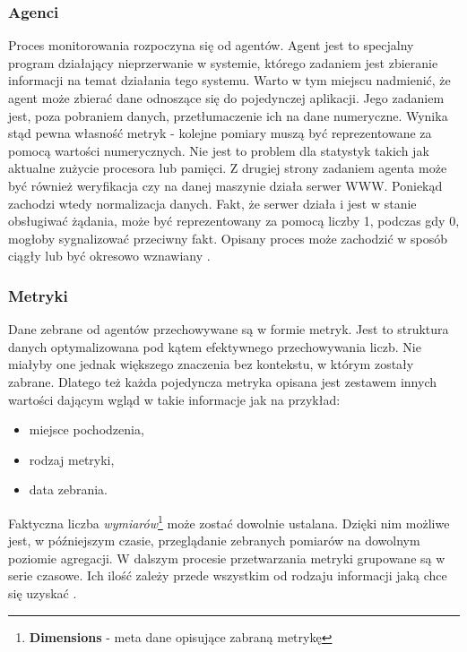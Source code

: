         \subsubsection{Agenci}
        Proces monitorowania rozpoczyna się od agentów. Agent jest to specjalny program działający nieprzerwanie w systemie, którego
        zadaniem jest zbieranie informacji na temat działania tego systemu. Warto w tym miejscu nadmienić, że agent może zbierać dane odnoszące się do pojedynczej aplikacji. Jego zadaniem jest, poza pobraniem danych, przetłumaczenie ich na dane 
        numeryczne. Wynika stąd pewna własność metryk - kolejne pomiary muszą być reprezentowane za pomocą wartości numerycznych.
        Nie jest to problem dla statystyk takich jak aktualne zużycie procesora lub pamięci. Z drugiej strony zadaniem agenta
        może być również weryfikacja czy na danej maszynie działa serwer WWW. Poniekąd zachodzi wtedy normalizacja danych. Fakt, że
        serwer działa i jest w stanie obsługiwać żądania, może być reprezentowany za pomocą liczby 1, podczas gdy 0, mogłoby sygnalizować
        przeciwny fakt. Opisany proces może zachodzić w sposób ciągły lub być okresowo wznawiany \cite{monitoring_and_alerting}.
        
        \subsubsection{Metryki}
        Dane zebrane od agentów przechowywane są w formie metryk. Jest to struktura danych optymalizowana pod kątem
        efektywnego przechowywania liczb. Nie miałyby one jednak większego znaczenia bez kontekstu, w którym zostały
        zabrane. Dlatego też każda pojedyncza metryka opisana jest zestawem innych wartości dającym wgląd w takie
        informacje jak na przykład:
        \begin{itemize}
            \item miejsce pochodzenia,
            \item rodzaj metryki,
            \item data zebrania.
        \end{itemize}
        Faktyczna liczba \textit{wymiarów}\footnote{\textbf{Dimensions} - meta dane opisujące zabraną metrykę} może
        zostać dowolnie ustalana. Dzięki nim możliwe jest, w późniejszym czasie, przeglądanie zebranych pomiarów
        na dowolnym poziomie agregacji. W dalszym procesie przetwarzania metryki grupowane są w serie czasowe. Ich ilość
        zależy przede wszystkim od rodzaju informacji jaką chce się uzyskać \cite{monitoring_and_alerting}.
        
